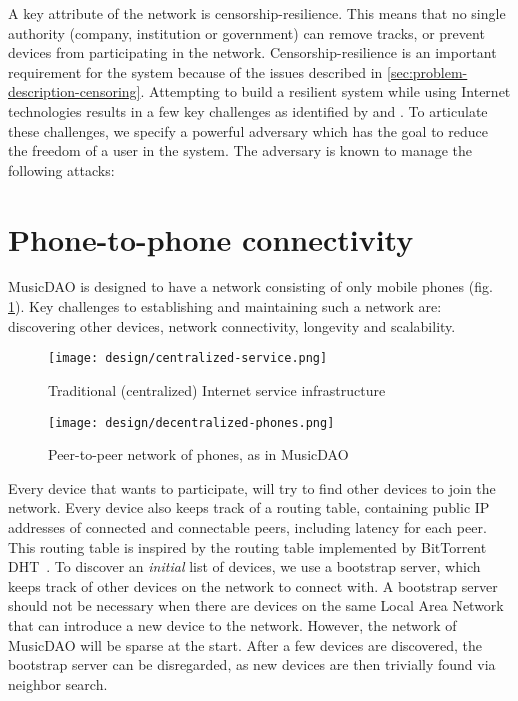 A key attribute of the network is censorship-resilience. This means that no single authority (company, institution or government) can remove tracks, or prevent devices from participating in the network. Censorship-resilience is an important requirement for the system because of the issues described in \ref{sec:problem-description-censoring}. Attempting to build a resilient system while using Internet technologies results in a few key challenges as identified by \cite{pouwelse2012censorship} and \cite{di2014bypassing}. To articulate these challenges, we specify a powerful adversary which has the goal to reduce the freedom of a user in the system. The adversary is known to manage the following attacks: %

\section{Phone-to-phone connectivity}
MusicDAO is designed to have a network consisting of only mobile phones (fig. \ref{fig:decentralized-phones}). Key challenges to establishing and maintaining such a network are: discovering other devices, network connectivity, longevity and scalability.

\begin{figure}
        \centering
        \texttt{[image: design/centralized-service.png]}
        \caption{Traditional (centralized) Internet service infrastructure}
        \label{fig:centralized-service}
    \endminipage\hfill
        \centering
        \texttt{[image: design/decentralized-phones.png]}
        \caption{Peer-to-peer network of phones, as in MusicDAO}
        \label{fig:decentralized-phones}
    \endminipage
\end{figure}

Every device that wants to participate, will try to find other devices to join the network. Every device also keeps track of a routing table, containing public IP addresses of connected and connectable peers, including latency for each peer. This routing table is inspired by the routing table implemented by BitTorrent DHT~\citep{bittorrentbep5dht}. To discover an \textit{initial} list of devices, we use a bootstrap server, which keeps track of other devices on the network to connect with. A bootstrap server should not be necessary when there are devices on the same Local Area Network that can introduce a new device to the network. However, the network of MusicDAO will be sparse at the start. After a few devices are discovered, the bootstrap server can be disregarded, as new devices are then trivially found via neighbor search.

